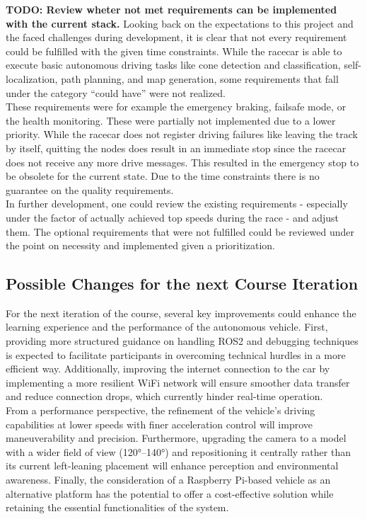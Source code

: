 \textbf{TODO: Review wheter not met requirements can be implemented with the current stack.}
Looking back on the expectations to this project and the faced challenges during development, it is clear that not every requirement could be fulfilled with the given time constraints. While the racecar is able to execute basic autonomous driving tasks like cone detection and classification, self-localization, path planning, and map generation, some requirements that fall under the category ``could have'' were not realized.\\
\newline
These requirements were for example the emergency braking, failsafe mode, or the health monitoring. These were partially not implemented due to a lower priority. While the racecar does not register driving failures like leaving the track by itself, quitting the nodes does result in an immediate stop since the racecar does not receive any more drive messages. This resulted in the emergency stop to be obsolete for the current state. Due to the time constraints there is no guarantee on the quality requirements. \\
\newline
In further development, one could review the existing requirements - especially under the factor of actually achieved top speeds during the race - and adjust them. The optional requirements that were not fulfilled could be reviewed under the point on necessity and implemented given a prioritization. \\
\subsection{Possible Changes for the next Course Iteration}
For the next iteration of the course, several key improvements could enhance the learning experience and the performance of the autonomous vehicle. First, providing more structured guidance on handling ROS2 and debugging techniques is expected to facilitate participants in overcoming technical hurdles in a more efficient way.
Additionally, improving the internet connection to the car by implementing a more resilient WiFi network will ensure smoother data transfer and reduce connection drops, which currently hinder real-time operation.\\
From a performance perspective, the refinement of the vehicle's driving capabilities at lower speeds with finer acceleration control will improve maneuverability and precision. 
Furthermore, upgrading the camera to a model with a wider field of view (120°–140°) and repositioning it centrally rather than its current left-leaning placement will enhance perception and environmental awareness. 
Finally, the consideration of a Raspberry Pi-based vehicle as an alternative platform has the potential to offer a cost-effective solution while retaining the essential functionalities of the system.
